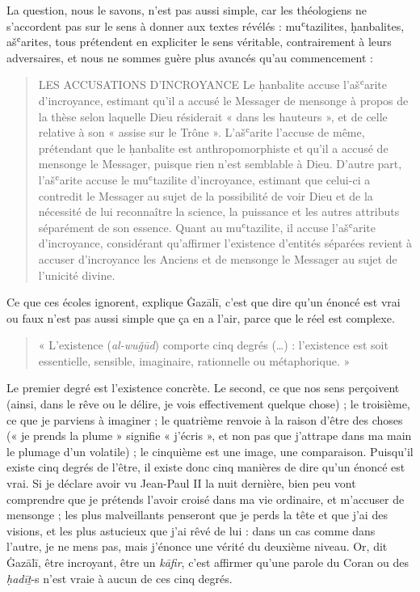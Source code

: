 La question, nous le savons, n'est pas aussi simple, car les théologiens
ne s'accordent pas sur le sens à donner aux textes révélés :
muʿtazilites, ḥanbalites, ašʿarites, tous prétendent en expliciter le
sens véritable, contrairement à leurs adversaires, et nous ne sommes
guère plus avancés qu'au commencement :
\begin{quote}
    LES ACCUSATIONS D’INCROYANCE
    Le ḥanbalite accuse l’ašʿarite d’incroyance, estimant qu’il a accusé le Messager de mensonge à propos de la thèse selon laquelle Dieu résiderait « dans les hauteurs », et de celle relative à son « assise sur le Trône ». L’ašʿarite l’accuse de même, prétendant que le ḥanbalite est anthropomorphiste et qu’il a accusé de mensonge le Messager, puisque rien n’est semblable à Dieu. D’autre part, l’ašʿarite accuse le muʿtazilite d’incroyance, estimant que celui-ci a contredit le Messager au sujet de la possibilité de voir Dieu et de la nécessité de lui reconnaître la science, la puissance et les autres attributs séparément de son essence. Quant au muʿtazilite, il accuse l’ašʿarite d’incroyance, considérant qu’affirmer l’existence d’entités séparées revient à accuser d’incroyance les Anciens et de mensonge le Messager au sujet de l’unicité divine.
\end{quote}
Ce que ces écoles ignorent, explique Ġazālī, c'est que dire qu'un énoncé
est vrai ou faux n'est pas aussi simple que ça en a l'air, parce que le
réel est complexe. \begin{quote}
    « L'existence (\emph{al-wuǧūd}) comporte cinq degrés
(\ldots) : l'existence est soit essentielle, sensible, imaginaire,
rationnelle ou métaphorique. » 
\end{quote}
Le premier degré est l'existence
concrète. Le second, ce que nos sens perçoivent (ainsi, dans le rêve ou
le délire, je vois effectivement quelque chose) ; le troisième,
ce que je parviens à imaginer ; le quatrième renvoie à la raison d'être
des choses (« je prends la plume » signifie « j'écris », et non pas que
j'attrape dans ma main le plumage d'un volatile) ; le cinquième est une
image, une comparaison. Puisqu'il existe cinq degrés de l'être, il
existe donc cinq manières de dire qu'un énoncé est vrai. Si je déclare
avoir vu Jean-Paul II la nuit dernière, bien peu vont comprendre que je
prétends l'avoir croisé dans ma vie ordinaire, et m'accuser de mensonge
; les plus malveillants penseront que je perds la tête et que j'ai des
visions, et les plus astucieux que j'ai rêvé de lui : dans un cas comme
dans l'autre, je ne mens pas, mais j'énonce une vérité du deuxième
niveau. Or, dit Ġazālī, être incroyant, être un \emph{kāfir}, c'est
affirmer qu'une parole du Coran ou des \emph{ḥadīṯ}-s n'est vraie à
aucun de ces cinq degrés.

